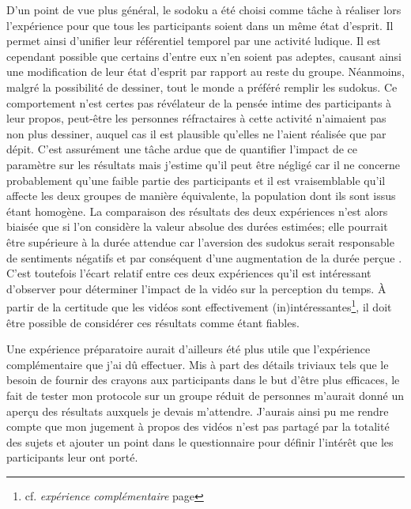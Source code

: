 \documentclass[12pt,fleqn,oneside,french,openany]{book} %
\begin{document}
D'un point de vue plus général, le sodoku a été choisi comme tâche à réaliser lors l'expérience pour que tous les participants soient dans un même état d'esprit. Il permet ainsi d'unifier leur référentiel temporel par une activité ludique. Il est cependant possible que certains d'entre eux n'en soient pas adeptes, causant ainsi une modification de leur état d'esprit par rapport au reste du groupe. Néanmoins, malgré la possibilité de dessiner, tout le monde a préféré remplir les sudokus. Ce comportement n'est certes pas révélateur de la pensée intime des participants à leur propos, peut-être les personnes réfractaires à cette activité n'aimaient pas non plus dessiner, auquel cas il est plausible qu'elles ne l'aient réalisée que par dépit. C'est assurément une tâche ardue que de quantifier l'impact de ce paramètre sur les résultats mais j'estime qu'il peut être négligé car il ne concerne probablement qu'une faible partie des participants et il est vraisemblable qu'il affecte les deux groupes de manière équivalente, la population dont ils sont issus étant homogène. La comparaison des résultats des deux expériences n'est alors biaisée que si l'on considère la valeur absolue des durées estimées; elle pourrait être supérieure à la durée attendue car l'aversion des sudokus serait responsable de sentiments négatifs et par conséquent d'une augmentation de la durée perçue \cite{emotionsTemps,emotionsTemps2}. C'est toutefois l'écart relatif entre ces deux expériences qu'il est intéressant d'observer pour déterminer l'impact de la vidéo sur la perception du temps. À partir de la certitude que les vidéos sont effectivement (in)intéressantes\footnote{cf. \emph{expérience complémentaire} page \pageref{ssec:exp1.2}}, il doit être possible de considérer ces résultats comme étant fiables. 

Une expérience préparatoire aurait d'ailleurs été plus utile que l'expérience complémentaire que j'ai dû effectuer. Mis à part des détails triviaux tels que le besoin de fournir des crayons aux participants dans le but d'être plus efficaces, le fait de tester mon protocole sur un groupe réduit de personnes m'aurait donné un aperçu des résultats auxquels je devais m'attendre. J'aurais ainsi pu me rendre compte que mon jugement à propos des vidéos n'est pas partagé par la totalité des sujets et ajouter un point dans le questionnaire pour définir l'intérêt que les participants leur ont porté.
\end{document}
